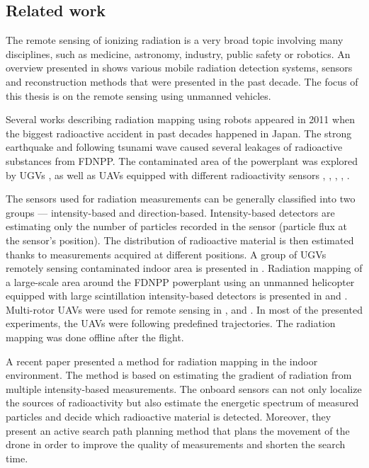\subsection{Related work}
The remote sensing of ionizing radiation is a very broad topic involving many disciplines, such as medicine, astronomy, industry, public safety or robotics.
An overview presented in \cite{radiation_detection_systems_overview} shows various mobile radiation detection systems, sensors and reconstruction methods that were presented in the past decade.
The focus of this thesis is on the remote sensing using unmanned vehicles.

Several works describing radiation mapping using robots appeared in 2011 when the biggest radioactive accident in past decades happened in Japan.
The strong earthquake and following tsunami wave caused several leakages of radioactive substances from \ac{FDNPP}.
The contaminated area of the powerplant was explored by \ac{UGV}s \cite{fuku2012}, \cite{fuku_compton} as well as \ac{UAV}s equipped with different radioactivity sensors \cite{sanada2015}, \cite{towler2012}, \cite{Jiang2015}, \cite{Mochizuki_2017}, \cite{sato_drone_compton_camera_2018}.

The sensors used for radiation measurements can be generally classified into two groups --- intensity-based and direction-based.
Intensity-based detectors are estimating only the number of particles recorded in the sensor (particle flux at the sensor's position).
The distribution of radioactive material is then estimated thanks to measurements acquired at different positions.
A group of \ac{UGV}s remotely sensing contaminated indoor area is presented in \cite{fuku2012}.
Radiation mapping of a large-scale area around the \ac{FDNPP} powerplant using an unmanned helicopter equipped with large scintillation intensity-based detectors is presented in \cite{sanada2015} and \cite{towler2012}.
Multi-rotor \ac{UAV}s were used for remote sensing in \cite{nine_drone_fukushima}, \cite{ten_remote_sensing_with_uderstanding_uav_ugv} and \cite{eleven_remote_sensing_non_japan}.
In most of the presented experiments, the \ac{UAV}s were following predefined trajectories.
The radiation mapping was done offline after the flight.

A recent paper \cite{mascarich2022} presented a method for radiation mapping in the indoor environment.
The method is based on estimating the gradient of radiation from multiple intensity-based measurements.
The onboard sensors can not only localize the sources of radioactivity but also estimate the energetic spectrum of measured particles and decide which radioactive material is detected.
Moreover, they present an active search path planning method that plans the movement of the drone in order to improve the quality of measurements and shorten the search time.

